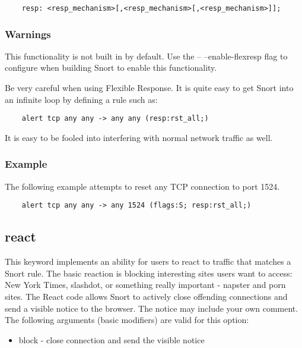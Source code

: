 \documentclass[english]{report}
\begin{document}
\begin{verbatim}
    resp: <resp_mechanism>[,<resp_mechanism>[,<resp_mechanism>]];
\end{verbatim}

\subsubsection{Warnings}

This functionality is not built in by default.  Use the -- --enable-flexresp
flag to configure when building Snort to enable this functionality.

Be very careful when using Flexible Response. It is quite easy to get Snort
into an infinite loop by defining a rule such as:

\begin{verbatim}
    alert tcp any any -> any any (resp:rst_all;)
\end{verbatim}

It is easy to be fooled into interfering with normal network traffic as well.

\subsubsection{Example}

The following example attempts to reset any TCP connection to port 1524.
\begin{verbatim}
    alert tcp any any -> any 1524 (flags:S; resp:rst_all;)
\end{verbatim}

\subsection{react}

This keyword implements an ability for users to react to traffic that matches a
Snort rule. The basic reaction is blocking interesting sites users want to
access: New York Times, slashdot, or something really important - napster and
porn sites. The React code allows Snort to actively close offending connections
and send a visible notice to the browser. The notice may include your own
comment. The following arguments (basic modifiers) are valid for this option:

\begin{itemize}
\item block - close connection and send the visible notice 
\end{itemize}
\end{document}
